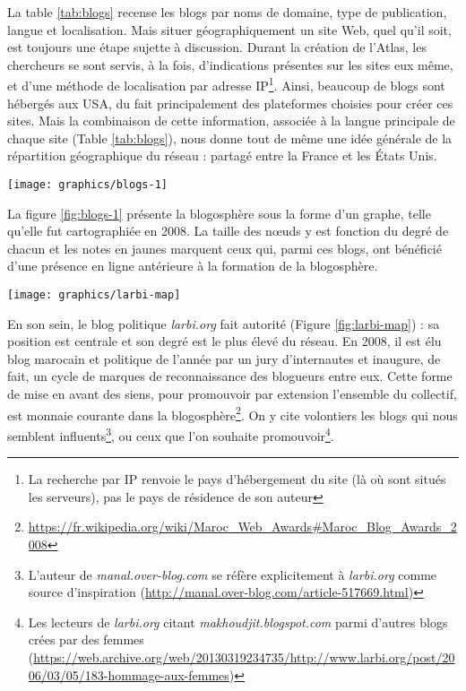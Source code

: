 \documentclass[symmetric,justified,marginals=raggedouter]{tufte-book}
\begin{document}
La table \ref{tab:blogs} recense les blogs par noms de domaine, type de publication, langue et localisation. Mais situer géographiquement un site Web, quel qu'il soit, est toujours une étape sujette à discussion. Durant la création de l'Atlas, les chercheurs se sont servis, à la fois, d'indications présentes sur les sites eux même, et d'une méthode de localisation par adresse IP\footnote{La recherche par IP renvoie le pays d'hébergement du site (là où sont situés les serveurs), pas le pays de résidence de son auteur}. Ainsi, beaucoup de blogs sont hébergés aux USA, du fait principalement des plateformes choisies pour créer ces sites. Mais la combinaison de cette information, associée à la langue principale de chaque site (Table \ref{tab:blogs}), nous donne tout de même une idée générale de la répartition géographique du réseau : partagé entre la France et les États Unis.

\begin{figure*}
  \texttt{[image: graphics/blogs-1]}
  \caption{La blogosphère marocaine en 2008}
  \label{fig:blogs-1}
\end{figure*}

\noindent La figure \ref{fig:blogs-1} présente la blogosphère sous la forme d'un graphe, telle qu'elle fut cartographiée en 2008. La taille des nœuds y est fonction du degré de chacun et les notes en jaunes marquent ceux qui, parmi ces blogs, ont bénéficié d'une présence en ligne antérieure à la formation de la blogosphère. 

\begin{marginfigure}%
  \vspace*{2cm} 
  \texttt{[image: graphics/larbi-map]}
  \vspace*{0.2cm}  
  \caption{\textit{larbi.org} (rouge) dans l'e-Diaspora marocaine}
  \label{fig:larbi-map}
\end{marginfigure} 

En son sein, le blog politique \textit{larbi.org} fait autorité (Figure \ref{fig:larbi-map}) : sa position est centrale et son degré est le plus élevé du réseau. En 2008, il est élu blog marocain et politique de l'année par un jury d'internautes et inaugure, de fait, un cycle de marques de reconnaissance des blogueurs entre eux. Cette forme de mise en avant des siens, pour promouvoir par extension l'ensemble du collectif, est monnaie courante dans la blogosphère\footnote{\url{https://fr.wikipedia.org/wiki/Maroc\_Web\_Awards\#Maroc\_Blog\_Awards\_2008}}. On y cite volontiers les blogs qui nous semblent influents\footnote{L'auteur de \textit{manal.over-blog.com} se réfère explicitement à \textit{larbi.org} comme source d'inspiration (\url{http://manal.over-blog.com/article-517669.html})}, ou  ceux que l'on souhaite promouvoir\footnote{Les lecteurs de \textit{larbi.org} citant \textit{makhoudjit.blogspot.com} parmi d'autres blogs crées par des femmes  (\url{https://web.archive.org/web/20130319234735/http://www.larbi.org/post/2006/03/05/183-hommage-aux-femmes})}.
\end{document}
